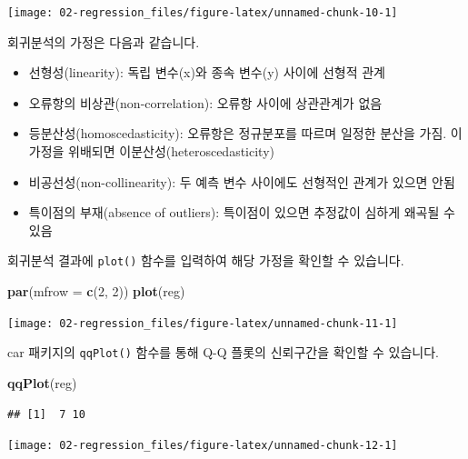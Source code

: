 \documentclass[12pt,]{book}
\newenvironment{Shaded}{\begin{snugshade}}{\end{snugshade}}
\newcommand{\DataTypeTok}[1]{\textcolor[rgb]{0.13,0.29,0.53}{#1}}
\newcommand{\DecValTok}[1]{\textcolor[rgb]{0.00,0.00,0.81}{#1}}
\newcommand{\KeywordTok}[1]{\textcolor[rgb]{0.13,0.29,0.53}{\textbf{#1}}}
\newcommand{\NormalTok}[1]{#1}
\providecommand{\tightlist}{%
  \setlength{\itemsep}{0pt}\setlength{\parskip}{0pt}}
\begin{document}
\begin{center}\texttt{[image: 02-regression\_files/figure-latex/unnamed-chunk-10-1]} \end{center}

회귀분석의 가정은 다음과 같습니다.

\begin{itemize}
\tightlist
\item
  선형성(linearity): 독립 변수(x)와 종속 변수(y) 사이에 선형적 관계
\item
  오류항의 비상관(non-correlation): 오류항 사이에 상관관계가 없음
\item
  등분산성(homoscedasticity): 오류항은 정규분포를 따르며 일정한 분산을 가짐. 이 가정을 위배되면 이분산성(heteroscedasticity)
\item
  비공선성(non-collinearity): 두 예측 변수 사이에도 선형적인 관계가 있으면 안됨
\item
  특이점의 부재(absence of outliers): 특이점이 있으면 추정값이 심하게 왜곡될 수 있음
\end{itemize}

회귀분석 결과에 \texttt{plot()} 함수를 입력하여 해당 가정을 확인할 수 있습니다.

\begin{Shaded}
\begin{Highlighting}[]
\KeywordTok{par}\NormalTok{(}\DataTypeTok{mfrow =} \KeywordTok{c}\NormalTok{(}\DecValTok{2}\NormalTok{, }\DecValTok{2}\NormalTok{))}
\KeywordTok{plot}\NormalTok{(reg)}
\end{Highlighting}
\end{Shaded}

\begin{center}\texttt{[image: 02-regression\_files/figure-latex/unnamed-chunk-11-1]} \end{center}

car 패키지의 \texttt{qqPlot()} 함수를 통해 Q-Q 플롯의 신뢰구간을 확인할 수 있습니다.

\begin{Shaded}
\begin{Highlighting}[]
\KeywordTok{qqPlot}\NormalTok{(reg)}
\end{Highlighting}
\end{Shaded}

\begin{verbatim}
## [1]  7 10
\end{verbatim}

\begin{center}\texttt{[image: 02-regression\_files/figure-latex/unnamed-chunk-12-1]} \end{center}
\end{document}
